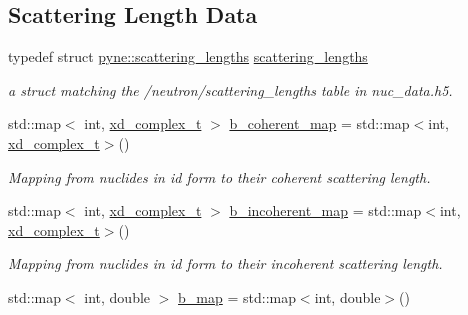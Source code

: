 \subsection*{Scattering Length Data}
\begin{DoxyCompactItemize}
\item 
typedef struct \hyperlink{structpyne_1_1scattering__lengths}{pyne\+::scattering\+\_\+lengths} \hyperlink{namespacepyne_a9a7904773bd3c8c5b8c4e10360c78c89}{scattering\+\_\+lengths}\hypertarget{namespacepyne_a9a7904773bd3c8c5b8c4e10360c78c89}{}\label{namespacepyne_a9a7904773bd3c8c5b8c4e10360c78c89}

\begin{DoxyCompactList}\small\item\em a struct matching the \textquotesingle{}/neutron/scattering\+\_\+lengths\textquotesingle{} table in nuc\+\_\+data.\+h5. \end{DoxyCompactList}\item 
std\+::map$<$ int, \hyperlink{structxd__complex__t}{xd\+\_\+complex\+\_\+t} $>$ \hyperlink{namespacepyne_a2bf1da1e7baf82a149d383b448cb4558}{b\+\_\+coherent\+\_\+map} = std\+::map$<$int, \hyperlink{structxd__complex__t}{xd\+\_\+complex\+\_\+t}$>$()\hypertarget{namespacepyne_a2bf1da1e7baf82a149d383b448cb4558}{}\label{namespacepyne_a2bf1da1e7baf82a149d383b448cb4558}

\begin{DoxyCompactList}\small\item\em Mapping from nuclides in id form to their coherent scattering length. \end{DoxyCompactList}\item 
std\+::map$<$ int, \hyperlink{structxd__complex__t}{xd\+\_\+complex\+\_\+t} $>$ \hyperlink{namespacepyne_a1206591ebb3e8305358495b8c8730b65}{b\+\_\+incoherent\+\_\+map} = std\+::map$<$int, \hyperlink{structxd__complex__t}{xd\+\_\+complex\+\_\+t}$>$()\hypertarget{namespacepyne_a1206591ebb3e8305358495b8c8730b65}{}\label{namespacepyne_a1206591ebb3e8305358495b8c8730b65}

\begin{DoxyCompactList}\small\item\em Mapping from nuclides in id form to their incoherent scattering length. \end{DoxyCompactList}\item 
std\+::map$<$ int, double $>$ \hyperlink{namespacepyne_ab4e41cc84fefb9085e62ad030a2b4ee6}{b\+\_\+map} = std\+::map$<$int, double$>$()\hypertarget{namespacepyne_ab4e41cc84fefb9085e62ad030a2b4ee6}{}\label{namespacepyne_ab4e41cc84fefb9085e62ad030a2b4ee6}


\end{DoxyCompactItemize}
